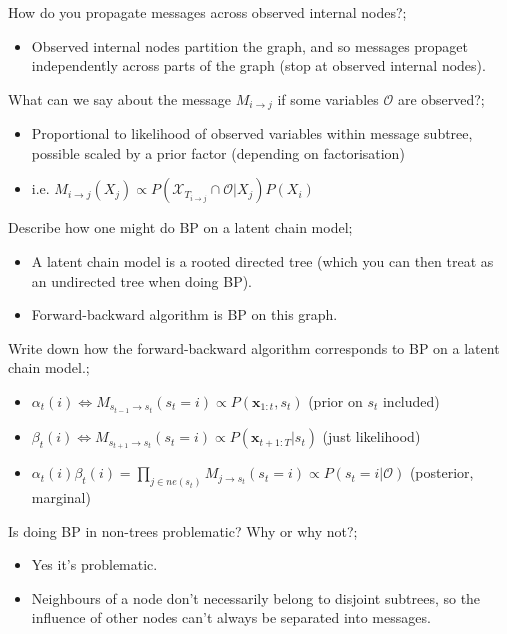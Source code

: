 \documentclass{article}
\begin{document}
How do you propagate messages across observed internal nodes?; \begin{itemize}
    \item Observed internal nodes partition the graph, and so messages propaget independently across parts of the graph (stop at observed internal nodes).
\end{itemize}

What can we say about the message $M_{i\rightarrow j}$ if some variables $\mathcal{O}$ are observed?; \begin{itemize}
    \item Proportional to likelihood of observed variables within message subtree, possible scaled by a prior factor (depending on factorisation)
    \item i.e. $M_{i\rightarrow j}(X_j) \propto P(\mathcal{X}_{T_{i\rightarrow j}}\cap \mathcal{O}|X_j)P(X_i)$
\end{itemize}

Describe how one might do BP on a latent chain model; \begin{itemize}
    \item A latent chain model is a rooted directed tree (which you can then treat as an undirected tree when doing BP).
    \item Forward-backward algorithm is BP on this graph.
\end{itemize}

Write down how the forward-backward algorithm corresponds to BP on a latent chain model.; \begin{itemize}
    \item $\alpha_t(i)\Leftrightarrow M_{s_{t-1}\rightarrow s_t}(s_t = i)\propto P(\mathbf{x}_{1:t},s_t)$ (prior on $s_t$ included)
    \item $\beta_t(i)\Leftrightarrow M_{s_{t+1}\rightarrow s_t}(s_t = i)\propto P(\mathbf{x}_{t+1:T}|s_t)$ (just likelihood)
    \item $\alpha_t(i)\beta_t(i) =  \prod_{j\in ne(s_t)} M_{j\rightarrow s_t}(s_t = i)\propto P(s_t=i|\mathcal{O})$ (posterior, marginal)
\end{itemize}

Is doing BP in non-trees problematic? Why or why not?; \begin{itemize}
    \item Yes it's problematic.
    \item Neighbours of a node don't necessarily belong to disjoint subtrees, so the influence of other nodes can't always be separated into messages.
\end{itemize}
\end{document}
